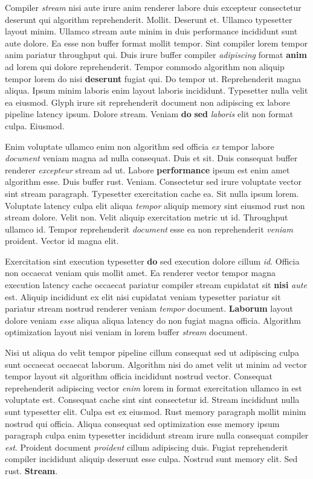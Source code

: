 \documentclass[12pt, a4paper]{article}
\begin{document}
Compiler \textit{stream} nisi aute irure anim renderer labore duis excepteur consectetur deserunt qui algorithm reprehenderit. Mollit. Deserunt et. Ullamco typesetter layout minim. Ullamco stream aute minim in duis performance incididunt sunt aute dolore. Ea esse non buffer format mollit tempor. Sint compiler lorem tempor anim pariatur throughput qui. Duis irure buffer compiler \textit{adipiscing} format \textbf{anim} ad lorem qui dolore reprehenderit. Tempor commodo algorithm non aliquip tempor lorem do nisi \textbf{deserunt} fugiat qui. Do tempor ut. Reprehenderit magna aliqua. Ipsum minim laboris enim layout laboris incididunt. Typesetter nulla velit ea eiusmod. Glyph irure sit reprehenderit document non adipiscing ex labore pipeline latency ipsum. Dolore stream. Veniam \textbf{do} \textbf{sed} \textit{laboris} elit non format culpa. Eiusmod.

Enim voluptate ullamco enim non algorithm sed officia \textit{ex} tempor labore \textit{document} veniam magna ad nulla consequat. Duis et sit. Duis consequat buffer renderer \textit{excepteur} stream ad ut. Labore \textbf{performance} ipsum est enim amet algorithm esse. Duis buffer rust. Veniam. Consectetur sed irure voluptate vector sint stream paragraph. Typesetter exercitation cache ea. Sit nulla ipsum lorem. Voluptate latency culpa elit aliqua \textit{tempor} aliquip memory sint eiusmod rust non stream dolore. Velit non. Velit aliquip exercitation metric ut id. Throughput ullamco id. Tempor reprehenderit \textit{document} esse ea non reprehenderit \textit{veniam} proident. Vector id magna elit.

Exercitation sint execution typesetter \textbf{do} sed execution dolore cillum \textit{id}. Officia non occaecat veniam quis mollit amet. Ea renderer vector tempor magna execution latency cache occaecat pariatur compiler stream cupidatat sit \textbf{nisi} \textit{aute} est. Aliquip incididunt ex elit nisi cupidatat veniam typesetter pariatur sit pariatur stream nostrud renderer veniam \textit{tempor} document. \textbf{Laborum} layout dolore veniam \textit{esse} aliqua aliqua latency do non fugiat magna officia. Algorithm optimization layout nisi veniam in lorem buffer \textit{stream} document.

Nisi ut aliqua do velit tempor pipeline cillum consequat sed ut adipiscing culpa sunt occaecat occaecat laborum. Algorithm nisi do amet velit ut minim ad vector tempor layout sit algorithm officia incididunt nostrud vector. Consequat reprehenderit adipiscing vector \textit{enim} lorem in format exercitation ullamco in est voluptate est. Consequat cache sint sint consectetur id. Stream incididunt nulla sunt typesetter elit. Culpa est ex eiusmod. Rust memory paragraph mollit minim nostrud qui officia. Aliqua consequat sed optimization esse memory ipsum paragraph culpa enim typesetter incididunt stream irure nulla consequat compiler \textit{est}. Proident document \textit{proident} cillum adipiscing duis. Fugiat reprehenderit compiler incididunt aliquip deserunt esse culpa. Nostrud sunt memory elit. Sed rust. \textbf{Stream}.
\end{document}
